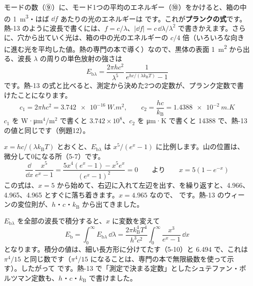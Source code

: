 \label{ph:原-2:sec11}
モードの数（⑨）に、モード1つの平均のエネルギー（⑩）をかけると、箱の中の \qty{1}{m^3}・はば $\dd f$ あたりの光のエネルギーは
\label{ph:原-2:planck}です。これが\textbf{プランクの式}です。熱-13 のように波長で書くには、$f=c/\lambda$、$|\dd f|=c\,\dd\lambda/\lambda^2$ で書きかえます。さらに、穴から出ていく光は、箱の中の光のエネルギーの $c/4$ 倍（いろいろな向きに進む光を平均した値。熱の専門の本で導く）なので、黒体の表面 \qty{1}{m^2} から出る、波長 $\lambda$ の周りの単色放射の強さは
\[ E_{\mathrm b\lambda}=\frac{2\pi hc^2}{\lambda^5}\,\frac{1}{e^{hc/(\lambda k_{\mathrm B}T)}-1} \]
です。熱-13 の式と比べると、測定から決めた2つの定数が、プランク定数で書けたことになります。
\[ c_1=2\pi hc^2=\qty{3.742e-16}{W.m^2},\qquad c_2=\frac{hc}{k_{\mathrm B}}=\qty{1.4388e-2}{m.K} \]
$c_1$ を W·\unit{\micro m}$^4$/m$^2$ で書くと $3.742\times10^8$、$c_2$ を \unit{\micro m}·K で書くと \num{14388} で、熱-13 の値と同じです（例題12）。

$x=hc/(\lambda k_{\mathrm B}T)$ とおくと、$E_{\mathrm b\lambda}$ は $x^5/(e^x-1)$ に比例します。山の位置は、微分して0になる所（5-7）です。
\[ \frac{\dd}{\dd x}\,\frac{x^5}{e^x-1}=\frac{5x^4(e^x-1)-x^5e^x}{(e^x-1)^2}=0\qquad\text{より}\qquad x=5(1-e^{-x}) \]
この式は、$x=5$ から始めて、右辺に入れて左辺を出す、を繰り返すと、4.966、4.965、4.965 とすぐに落ち着きます。$x=4.965$ なので、
\label{ph:原-2:wien}です。熱-13 のウィーンの変位則が、$h$・$c$・$k_{\mathrm B}$ から出てきました。

$E_{\mathrm b\lambda}$ を全部の波長で積分すると、$x$ に変数を変えて
\[ E_{\mathrm b}=\int_0^\infty E_{\mathrm b\lambda}\,\dd\lambda=\frac{2\pi k_{\mathrm B}^4T^4}{h^3c^2}\int_0^\infty\frac{x^3}{e^x-1}\,\dd x \]
となります。積分の値は、細い長方形に分けてたす（5-10）と 6.494 で、これは $\pi^4/15$ と同じ数です（$\pi^4/15$ になることは、専門の本で無限級数を使って示す）。したがって
\label{ph:原-2:sigma}です。熱-13 で「測定で決まる定数」としたシュテファン・ボルツマン定数も、$h$・$c$・$k_{\mathrm B}$ で書けました。

\begin{phflow}
\end{phflow}

